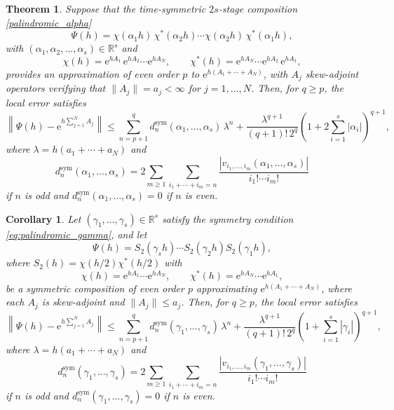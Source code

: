 \documentclass[11pt]{article}
\newcommand{\e}{\ensuremath{\mathrm{e}}}
\newtheorem{theorem}[lemma]{Theorem}
\newtheorem{corollary}[lemma]{Corollary}
\begin{document}
\begin{theorem} \label{th_compo_sym_refined_G}
Suppose that the time-symmetric $2s$-stage composition \eqref{palindromic_alpha} 
\[
   \Psi(h) = \chi(\alpha_{1} h) \, \chi^*(\alpha_{2} h) \cdots \chi(\alpha_2 h) \, \chi^*(\alpha_1 h), 
\]
with $(\alpha_1, \alpha_2, \ldots, \alpha_s) \in \mathbb{R}^s$ and
\[
  \chi(h) = \e^{h A_1} \, \e^{h A_2} \cdots \e^{h A_N}, \qquad \chi^*(h) = \e^{h A_N} \cdots \e^{h A_2} \, \e^{h A_1}, 
\]
 provides an approximation of even order $p$ to $\e^{h(A_1 + \cdots + A_N)}$,
with $A_j$ skew-adjoint operators verifying that $\|A_j\| = a_j < \infty$ for $j=1,\ldots, N$. Then, for $q\geq p$, the local error satisfies
\begin{equation*} 
  \left\|\Psi(h)-\e^{h \sum_{j=1}^N A_j} \right\| \le \sum_{n = p+1}^{q} d_n^{\mathrm{sym}}(\alpha_1,\ldots,\alpha_s)\, \lambda^n +
\frac{\lambda^{q+1}}{(q+1)! \, 2^{q}} \left(1 + 2 \sum_{i=1}^s |\alpha_i| \right)^{q+1},
\end{equation*}
where $\lambda = h (a_1 + \cdots + a_N)$ and
\begin{equation}
\label{eq:dn_sym}
d_n^{\mathrm{sym}}(\alpha_1,\ldots,\alpha_s) = 2 \sum_{m \geq 1} \sum_{i_1 + \cdots + i_m = n} \frac{|v_{i_1, \ldots, i_m}(\alpha_1, \ldots, \alpha_s)|}{i_1! \cdots i_m!}
\end{equation}
if $n$ is odd and $d_n^{\mathrm{sym}}(\alpha_1,\ldots,\alpha_s)=0$ if $n$ is even.
\end{theorem}



\begin{corollary} \label{th_compo_sym_refined}
Let $(\gamma_1, \ldots, \gamma_s) \in \mathbb{R}^s$ satisfy the symmetry condition \eqref{eq:palindromic_gamma}, and let
\[
\Psi(h) = S_2(\gamma_s h) \cdots S_2(\gamma_2 h) S_2(\gamma_1 h),
\]
where $S_2(h) = \chi(h/2)\chi^*(h/2)$ with
\[
\chi(h) = \mathrm{e}^{h A_1} \cdots \mathrm{e}^{h A_N}, \qquad 
\chi^*(h) = \mathrm{e}^{h A_N} \cdots \mathrm{e}^{h A_1},
\]
be a symmetric composition of even order $p$ approximating $\mathrm{e}^{h(A_1 + \cdots + A_N)}$, where each $A_j$ is skew-adjoint and $\|A_j\| \le a_j$. Then, for $q \geq p$, the local error satisfies
\[
\left\| \Psi(h) - \mathrm{e}^{h \sum_{j=1}^N A_j} \right\| \leq 
\sum_{n = p+1}^{q} d_n^{\mathrm{sym}}(\gamma_1,\ldots,\gamma_s)\, \lambda^n +
\frac{\lambda^{q+1}}{(q+1)! \, 2^{q}} \left(1 + \sum_{i=1}^s |\gamma_i| \right)^{q+1},
\]
where $\lambda = h (a_1 + \cdots + a_N)$ and
\begin{equation}
\label{eq:dn_sym2}
d_n^{\mathrm{sym}}(\gamma_1,\ldots,\gamma_s) = 2 \sum_{m \geq 1} \sum_{i_1 + \cdots + i_m = n} \frac{|v_{i_1, \ldots, i_m}(\gamma_1, \ldots, \gamma_s)|}{i_1! \cdots i_m!}
\end{equation}
if $n$ is odd and $d_n^{\mathrm{sym}}(\gamma_1,\ldots,\gamma_s)=0$ if $n$ is even.
\end{corollary}
\end{document}
